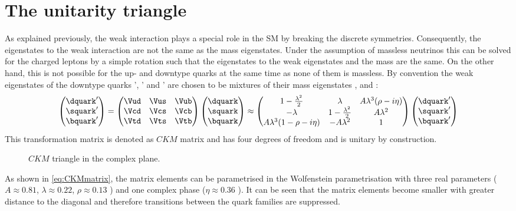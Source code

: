\section{The unitarity triangle}
\label{sec:unitarityTriangle}

As explained previously, the weak interaction plays a special role in the \ac{SM} by breaking the discrete symmetries.
Consequently, the eigenstates to the weak interaction are not the same as the mass eigenstates.
Under the assumption of massless neutrinos this can be solved for the charged leptons by a simple rotation such that the eigenstates to the weak eigenstates and the mass are the same.
On the other hand, this is not possible for the up- and downtype quarks at the same time as none of them is massless.
By convention the weak eigenstates of the downtype quarks \dquark', \squark' and \bquark' are chosen to be mixtures of their mass eigenstates \dquark, \squark and \bquark:
\begin{equation}
\begin{pmatrix} \dquark' \\ \squark' \\ \bquark' \end{pmatrix}
= \begin{pmatrix} \Vud & \Vus & \Vub \\ \Vcd & \Vcs & \Vcb \\ \Vtd & \Vts & \Vtb \end{pmatrix}
\begin{pmatrix} \dquark \\ \squark \\ \bquark \end{pmatrix}
\approx \begin{pmatrix} 1-\frac{\lambda^2}{2} & \lambda & A\lambda^3(\rho-i\eta) \\
                        -\lambda & 1-\frac{\lambda^2}{2} & A\lambda^2 \\
                        A\lambda^3(1-\rho-i\eta) & -A\lambda^2 & 1 \end{pmatrix}
\begin{pmatrix} \dquark' \\ \squark' \\ \bquark' \end{pmatrix} \label{eq:CKMmatrix}
\end{equation}
This transformation matrix is denoted as $CKM$ matrix and has four degrees of freedom and is unitary by construction.
\begin{figure}[tbp]
	\centering
	
	\caption{$CKM$ triangle in the complex plane.}
	\label{fig:ckmtheory}
\end{figure}
As shown in \cref{eq:CKMmatrix}, the matrix elements can be parametrised in the Wolfenstein parametrisation \cite{Wolfenstein:1983yz} with three real parameters ($A\approx0.81$, $\lambda\approx0.22$, $\rho\approx0.13$ \cite{PDG_2017}) and one complex phase ($\eta\approx0.36$ \cite{PDG_2017}).
It can be seen that the matrix elements become smaller with greater distance to the diagonal and therefore transitions between the quark families are suppressed.

